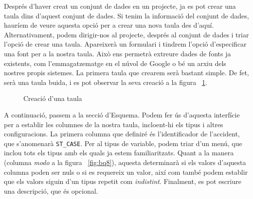 \documentclass[12pt,longbibliography]{article}
\theoremstyle{definition}
\theoremstyle{remark}
\begin{document}
Després d'haver creat un conjunt de dades en un projecte, ja es pot crear una taula dins d'aquest conjunt de dades. Si tenim la informació del conjunt de dades, hauríem de veure aquesta opció per a crear una nova taula des d'aquí. Alternativament, podem dirigir-nos al projecte, després al conjunt de dades i triar l'opció de crear una taula. Apareixerà un formulari i tindrem l'opció d'especificar una font per a la nostra taula. Això ens permetrà extreure dades de fonts ja existents, com l'emmagatzematge en el núvol de Google o bé un arxiu dels nostres propis sistemes. La primera taula que crearem serà bastant simple. De fet, serà una taula buida, i es pot observar la seva creació a la figura ~\ref{fig:bq6}. 

\vspace{2mm}
\begin{figure}[h!]
\par
{}%
\hfill
{}%
\par
\caption{Creació d'una taula}
\label{fig:bq6}
\end{figure}
\vspace{2mm}

A continuació, passem a la secció d'Esquema. Podem fer ús d'aquesta interfície per a establir les columnes de la nostra taula, incloent-hi els tipus i altres configuracions. La primera columna que definiré és l'identificador de l'accident, que s'anomenarà \verb|ST_CASE|. Per al tipus de variable, podem triar d'un menú, que inclou tots els tipus amb els quals ja estem familiaritzats. Quant a la manera (columna \textit{modo} a la figura ~\ref{fig:bq8}), aquesta determinarà si els valors d'aquesta columna poden ser nuls o si es requereix un valor, així com també podem establir que els valors siguin d'un tipus repetit com \textit{indistint}. Finalment, es pot escriure una descripció, que és opcional. 
\end{document}
